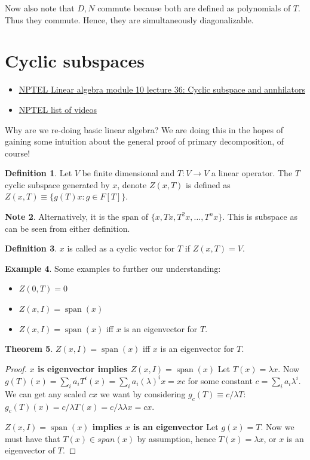 \documentclass{book}
\newcommand{\Span}{\operatorname{span}}
\newcommand{\spn}{\Span}
\theoremstyle{definition}
\newtheorem{theorem}{Theorem}
\newtheorem{example}[theorem]{Example}
\newtheorem{definition}[theorem]{Definition}
\newtheorem{note}[theorem]{Note}
\begin{document}
Now also note that $D, N$ commute because both are defined as polynomials
of $T$. Thus they commute. Hence, they are simultaneously diagonalizable.


\section{Cyclic subspaces}
\begin{itemize}
\item \href{https://www.youtube.com/watch?time_continue=12&v=6jNoJiqpRu8&feature=emb_logo}{NPTEL Linear
algebra module 10 lecture 36: Cyclic subspace and annhilators}
\item \href{https://www.nptelvideos.com/course.php?id=725}{NPTEL list of videos}
\end{itemize}
Why are we re-doing basic linear algebra? We are doing this in the
hopes of gaining some intuition about the general proof of primary
decomposition, of course!

\begin{definition}
Let $V$ be finite dimensional and $T: V \rightarrow V$ a linear operator.
The $T$ cyclic subspace generated by $x$, denote $Z(x, T)$ is defined
as $Z(x, T) \equiv \{ g(T)x: g \in F[T] \}$.
\end{definition}

\begin{note}
Alternatively, it
is the span of $\{ x, Tx, T^2x, \dots, T^n x \}$. This is subspace as can
be seen from either definition.
\end{note}

\begin{definition}
 $x$ is called as a cyclic vector for $T$ if $Z(x, T) = V$.
\end{definition}

\begin{example}
Some examples to further our understanding:
\begin{itemize}
\item $Z(0, T) = 0$
\item $Z(x, I) = \spn(x)$
\item $Z(x, I) = \spn(x)$ iff $x$ is an eigenvector for $T$.
\end{itemize}
\end{example}

\begin{theorem}
$Z(x, I) = \spn(x)$ iff $x$ is an eigenvector for $T$. 
\end{theorem}
\begin{proof}
\textbf{$x$ is eigenvector implies $Z(x, I) = \spn(x)$}
Let $T(x) = \lambda x $. Now $g(T)(x) = \sum_i a_i T^i(x) = \sum_i a_i (\lambda)^i x = x c$
for some constant $c = \sum_i a_i \lambda^i$. We can get any scaled $cx$ we want by considering
$g_c(T) \equiv c/\lambda T$: $g_c(T)(x) = c/\lambda T(x) = c/\lambda \lambda x = cx$.

\textbf{$Z(x, I) = \spn(x)$ implies $x$ is an eigenvector}
Let $g(x) = T$. Now we must have that $T(x) \in span(x)$ by assumption,
hence $T(x) = \lambda x$, or $x$ is an eigenvector of $T$.
\end{proof}
\end{document}
